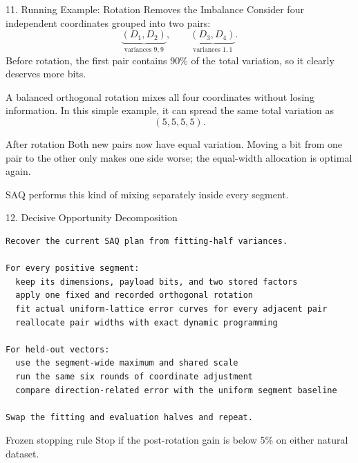 \documentclass[aspectratio=169]{beamer}
\begin{document}
\begin{frame}{11. Running Example: Rotation Removes the Imbalance}
\small
Consider four independent coordinates grouped into two pairs:
\[
\underbrace{(D_1,D_2)}_{\text{variances }9,9},\qquad
\underbrace{(D_3,D_4)}_{\text{variances }1,1}.
\]
Before rotation, the first pair contains 90\% of the total variation, so it
clearly deserves more bits.
\medskip

A balanced orthogonal rotation mixes all four coordinates without losing
information. In this simple example, it can spread the same total variation
as
\[
(5,5,5,5).
\]
\begin{alertblock}{After rotation}
Both new pairs now have equal variation. Moving a bit from one pair to the
other only makes one side worse; the equal-width allocation is optimal again.
\end{alertblock}
SAQ performs this kind of mixing separately inside every segment.
\end{frame}

\begin{frame}[fragile]{12. Decisive Opportunity Decomposition}
\footnotesize
\begin{verbatim}
Recover the current SAQ plan from fitting-half variances.

For every positive segment:
  keep its dimensions, payload bits, and two stored factors
  apply one fixed and recorded orthogonal rotation
  fit actual uniform-lattice error curves for every adjacent pair
  reallocate pair widths with exact dynamic programming

For held-out vectors:
  use the segment-wide maximum and shared scale
  run the same six rounds of coordinate adjustment
  compare direction-related error with the uniform segment baseline

Swap the fitting and evaluation halves and repeat.
\end{verbatim}
\begin{block}{Frozen stopping rule}
Stop if the post-rotation gain is below 5\% on either natural dataset.
\end{block}
\end{frame}
\end{document}
